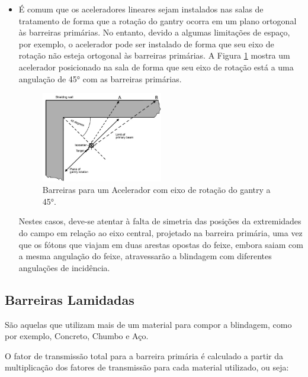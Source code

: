 \documentclass[11pt,a4paper]{article}
\begin{document}
\begin{itemize}
                \item É comum que os aceleradores lineares sejam instalados nas salas de tratamento de forma que a rotação do gantry ocorra em um plano ortogonal às barreiras primárias.  No entanto, devido a algumas limitações de espaço, por exemplo, o acelerador pode ser instalado de forma que seu eixo de rotação não esteja ortogonal às barreiras primárias. A Figura \ref{fig:esquemaBarreiraAceleradorAngulado} mostra um acelerador posicionado na sala de forma que seu eixo de rotação está a uma angulação de \ang{45} com as barreiras primárias. 
                
                    \begin{figure}[h]
                        \centering
                        \includegraphics[width=0.5\textwidth]{Imagens/esquemaBarreiraAceleradorAngulado.JPG}
                        \caption{Barreiras para um Acelerador com eixo de rotação do gantry a \ang{45}.}
                        \label{fig:esquemaBarreiraAceleradorAngulado}
                    \end{figure}

                    Nestes casos, deve-se atentar à falta de simetria das posições da extremidades do campo em relação ao eixo central, projetado na barreira primária, uma vez que os fótons que viajam em duas arestas opostas do feixe, embora saiam com a mesma angulação do feixe, atravessarão a blindagem com diferentes angulações de incidência.  
            \end{itemize}
        
        \subsection{Barreiras Lamidadas}
            
            São aquelas que utilizam mais de um material para compor a blindagem, como por exemplo, Concreto, Chumbo e Aço.

            O fator de transmissão total para a barreira primária é calculado a partir da multiplicação dos fatores de transmissão para cada material utilizado, ou seja:
\end{document}
